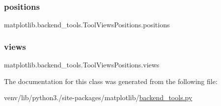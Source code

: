 \subsubsection{\texorpdfstring{positions}{positions}}
{\footnotesize\ttfamily matplotlib.\+backend\+\_\+tools.\+Tool\+Views\+Positions.\+positions}

\mbox{\label{classmatplotlib_1_1backend__tools_1_1ToolViewsPositions_a870b71f88ac37d2211aa4678cdd75c45}} 
\subsubsection{\texorpdfstring{views}{views}}
{\footnotesize\ttfamily matplotlib.\+backend\+\_\+tools.\+Tool\+Views\+Positions.\+views}



The documentation for this class was generated from the following file\+:\begin{DoxyCompactItemize}
\item 
venv/lib/python3./site-\/packages/matplotlib/\hyperlink{backend__tools_8py}{backend\+\_\+tools.\+py}\end{DoxyCompactItemize}
